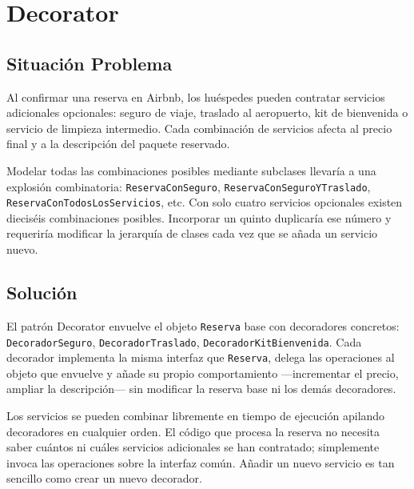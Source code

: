 
\chapter{Decorator}

\section{Situación Problema}

Al confirmar una reserva en Airbnb, los huéspedes pueden contratar
servicios adicionales opcionales: seguro de viaje, traslado al aeropuerto,
kit de bienvenida o servicio de limpieza intermedio. Cada combinación
de servicios afecta al precio final y a la descripción del paquete
reservado.

Modelar todas las combinaciones posibles mediante subclases llevaría
a una explosión combinatoria: \texttt{ReservaConSeguro},
\texttt{ReservaConSeguroYTraslado}, \texttt{ReservaConTodosLosServicios},
etc. Con solo cuatro servicios opcionales existen dieciséis combinaciones
posibles. Incorporar un quinto duplicaría ese número y requeriría
modificar la jerarquía de clases cada vez que se añada un servicio nuevo.

\section{Solución}

El patrón Decorator envuelve el objeto \texttt{Reserva} base con
decoradores concretos: \texttt{DecoradorSeguro},
\texttt{DecoradorTraslado}, \texttt{DecoradorKitBienvenida}. Cada
decorador implementa la misma interfaz que \texttt{Reserva}, delega
las operaciones al objeto que envuelve y añade su propio comportamiento
—incrementar el precio, ampliar la descripción— sin modificar la reserva
base ni los demás decoradores.

Los servicios se pueden combinar libremente en tiempo de ejecución
apilando decoradores en cualquier orden. El código que procesa la
reserva no necesita saber cuántos ni cuáles servicios adicionales se
han contratado; simplemente invoca las operaciones sobre la interfaz
común. Añadir un nuevo servicio es tan sencillo como crear un nuevo
decorador.

